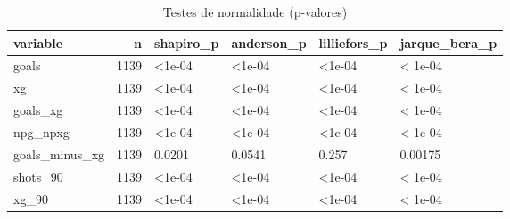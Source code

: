 \begin{table}

\caption{\label{tab:normalidade_g10}Testes de normalidade (p-valores)}
\centering
\begin{tabular}[t]{lrllll}
\toprule
variable & n & shapiro\_p & anderson\_p & lilliefors\_p & jarque\_bera\_p\\
\midrule
goals & 1139 & <1e-04 & <1e-04 & <1e-04 & < 1e-04\\
xg & 1139 & <1e-04 & <1e-04 & <1e-04 & < 1e-04\\
goals\_xg & 1139 & <1e-04 & <1e-04 & <1e-04 & < 1e-04\\
npg\_npxg & 1139 & <1e-04 & <1e-04 & <1e-04 & < 1e-04\\
goals\_minus\_xg & 1139 & 0.0201 & 0.0541 & 0.257 & 0.00175\\
\addlinespace
shots\_90 & 1139 & <1e-04 & <1e-04 & <1e-04 & < 1e-04\\
xg\_90 & 1139 & <1e-04 & <1e-04 & <1e-04 & < 1e-04\\
\bottomrule
\end{tabular}
\end{table}
